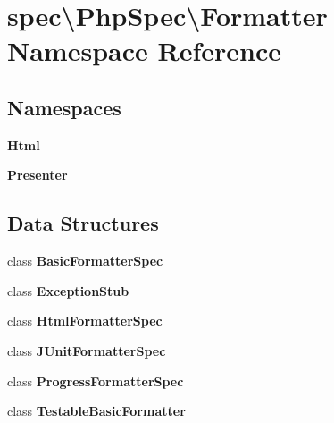 \section{spec\textbackslash{}Php\+Spec\textbackslash{}Formatter Namespace Reference}
\label{namespacespec_1_1_php_spec_1_1_formatter}
\subsection*{Namespaces}
\begin{DoxyCompactItemize}
\item 
 {\bf Html}
\item 
 {\bf Presenter}
\end{DoxyCompactItemize}
\subsection*{Data Structures}
\begin{DoxyCompactItemize}
\item 
class {\bf Basic\+Formatter\+Spec}
\item 
class {\bf Exception\+Stub}
\item 
class {\bf Html\+Formatter\+Spec}
\item 
class {\bf J\+Unit\+Formatter\+Spec}
\item 
class {\bf Progress\+Formatter\+Spec}
\item 
class {\bf Testable\+Basic\+Formatter}
\end{DoxyCompactItemize}
